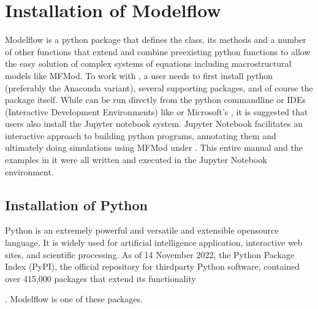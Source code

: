 \documentclass[letterpaper,10pt,english]{jupyterBook}
\begin{document}
\sphinxstepscope


\chapter{Installation of Modelflow}
\label{\detokenize{content/03_Installation/InstallingPython:installation-of-modelflow}}\label{\detokenize{content/03_Installation/InstallingPython::doc}}
\sphinxAtStartPar
Modelflow is a python package that defines the  class, its methods and a number of other functions that extend and combine pre\sphinxhyphen{}existing python functions to allow the easy solution of complex systems of equations including macro\sphinxhyphen{}structural models like MFMod.  To work with , a user needs to first install python (preferably the Anaconda variant), several supporting packages, and of course the  package itself.  While  can be run directly from the python command\sphinxhyphen{}line or IDEs (Interactive Development Environments) like  or Microsoft’s , it is suggested that users also install the Jupyter notebook system. Jupyter Notebook facilitates an interactive approach to building python programs, annotating them and ultimately doing simulations using MFMod under . This entire manual and the examples in it were all written and executed in the Jupyter Notebook environment.


\section{Installation of Python}
\label{\detokenize{content/03_Installation/InstallingPython:installation-of-python}}
\sphinxAtStartPar
Python is an extremely powerful and versatile and extensible open\sphinxhyphen{}source language. It is widely used for artificial intelligence application, interactive web sites, and scientific processing. As of 14 November 2022, the Python Package Index (PyPI), the official repository for third\sphinxhyphen{}party Python software, contained over 415,000 packages that extend its functionality %
\begin{footnote}[1]\sphinxAtStartFootnote
{}
%
\end{footnote}. Modelflow is one of these packages.
\end{document}

